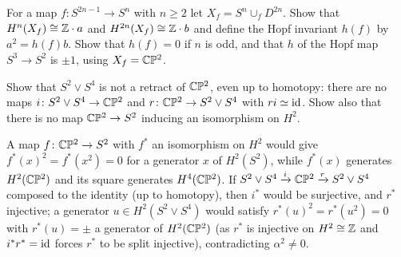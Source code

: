 \begin{exercise}\label{singular-cohomology:exercise-hopf-invariant}
For a map $f \colon S^{2n-1} \to S^n$ with $n \geq 2$ let $X_f = S^n \cup_f D^{2n}$. Show that $H^n(X_f) \cong \mathbb{Z} \cdot a$ and $H^{2n}(X_f) \cong \mathbb{Z} \cdot b$ and define the Hopf
invariant $h(f)$ by $a^2 = h(f)b$. Show that $h(f) = 0$ if $n$ is odd, and that $h$ of the Hopf map $S^3 \to S^2$ is $\pm 1$, using $X_f = \mathbb{C}\mathbb{P}^2$.
\end{exercise}

\begin{exercise}\label{singular-cohomology:exercise-retract-ring}
Show that $S^2 \vee S^4$ is not a retract of $\mathbb{C}\mathbb{P}^2$, even up to homotopy: there are no maps $i \colon S^2 \vee S^4 \to \mathbb{C}\mathbb{P}^2$ and $r \colon \mathbb{C}\mathbb{P}^2 \to S^2 \vee S^4$ with
$ri \simeq \mathrm{id}$. Show also that there is no map $\mathbb{C}\mathbb{P}^2 \to S^2$ inducing an isomorphism on $H^2$.
\end{exercise}

\begin{solution}
A map $f \colon \mathbb{C}\mathbb{P}^2 \to S^2$ with $f^*$ an isomorphism on $H^2$ would give $f^*(x)^2 = f^*(x^2) = 0$ for a generator $x$ of $H^2(S^2)$, while $f^*(x)$ generates $H^2(\mathbb{C}\mathbb{P}^2)$
and its square generates $H^4(\mathbb{C}\mathbb{P}^2)$. If $S^2 \vee S^4 \xrightarrow{i} \mathbb{C}\mathbb{P}^2 \xrightarrow{r} S^2 \vee S^4$ composed to the identity (up to homotopy), then $i^*$ would be
surjective, and $r^*$ injective; a generator $u \in H^2(S^2 \vee S^4)$ would satisfy $r^*(u)^2 = r^*(u^2) = 0$ with $r^*(u) = \pm$ a generator of $H^2(\mathbb{C}\mathbb{P}^2)$ (as $r^*$ is
injective on $H^2 \cong \mathbb{Z}$ and $i^*r^* = \mathrm{id}$ forces $r^*$ to be split injective), contradicting $\alpha^2 \neq 0$.
\end{solution}
